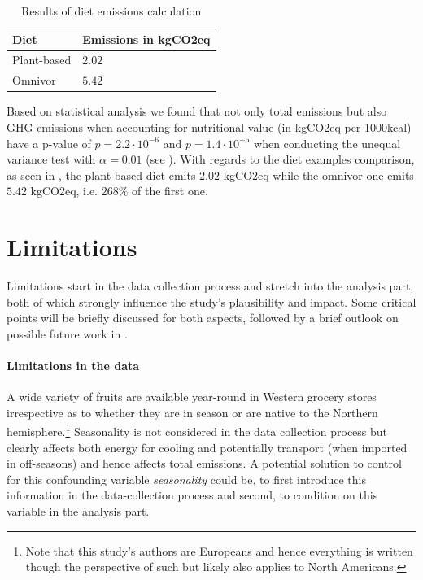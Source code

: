 \documentclass{article}
\begin{document}
\begin{table}[h]
  \caption{Results of diet emissions calculation}
  \label{tbl:results-diets}
  \centering
  \begin{tabular}{ll}
    \toprule
    Diet    & Emissions in kgCO2eq  \\
    \midrule
    Plant-based & $2.02$\\
    Omnivor    &  $5.42$\\
    \bottomrule
  \end{tabular}
\end{table}

Based on statistical analysis we found that not only total emissions but also GHG emissions when accounting for nutritional value (in kgCO2eq per 1000kcal) have a p-value of  $p= 2.2\cdot10^{-6} $  and $p= 1.4\cdot10^{-5}$  when conducting the unequal variance test with $\alpha = 0.01$ (see ). With regards to the diet examples comparison, as seen in , the plant-based diet emits $2.02$ kgCO2eq while the omnivor one emits $5.42$ kgCO2eq, i.e. $268\%$ of the first one.


\section{Limitations}
\label{limitations}
Limitations start in the data collection process and stretch into the analysis part, both of which strongly influence the study's plausibility and impact. Some critical points will be briefly discussed for both aspects, followed by  a brief outlook on possible future work in .

\paragraph*{Limitations in the data}
A wide variety of fruits  are  available year-round in Western grocery stores  irrespective as to whether  they are in season or are native to the Northern hemisphere.\footnote{Note that this study's authors are  Europeans and hence everything is written though the perspective of such but likely also applies to North Americans.} 
Seasonality is not considered in the data collection process but clearly affects both energy for cooling and  potentially transport (when imported in off-seasons) and hence affects total emissions.  
A potential solution to control for this confounding variable \textit{seasonality} could be, to first introduce this information in the data-collection process and second, to condition on this variable in the analysis part.
\end{document}
